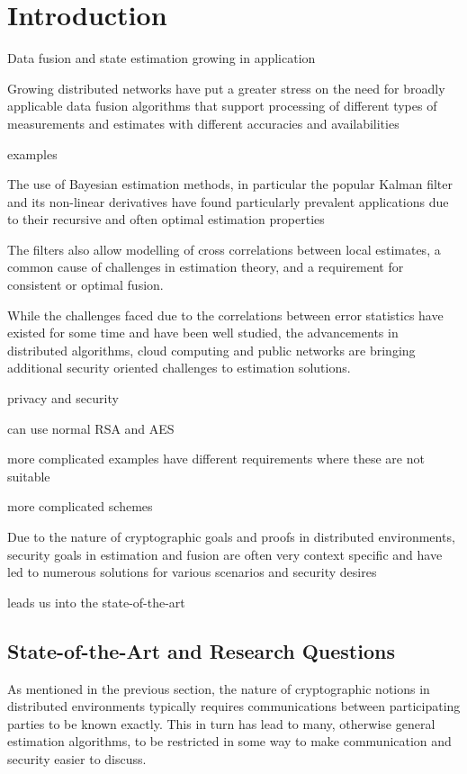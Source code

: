 
\chapter{Introduction}

Data fusion and state estimation growing in application

Growing distributed networks have put a greater stress on the need for broadly applicable data fusion algorithms that support processing of different types of measurements and estimates with different accuracies and availabilities

examples

The use of Bayesian estimation methods, in particular the popular Kalman filter and its non-linear derivatives have found particularly prevalent applications due to their recursive and often optimal estimation properties 

The filters also allow modelling of cross correlations between local estimates, a common cause of challenges in estimation theory, and a requirement for consistent or optimal fusion.

While the challenges faced due to the correlations between error statistics have existed for some time and have been well studied, the advancements in distributed algorithms, cloud computing and public networks are bringing additional security oriented challenges to estimation solutions.

privacy and security 

can use normal RSA and AES

more complicated examples have different requirements where these are not suitable

more complicated schemes

Due to the nature of cryptographic goals and proofs in distributed environments, security goals in estimation and fusion are often very context specific and have led to numerous solutions for various scenarios and security desires

leads us into the state-of-the-art


\section{State-of-the-Art and Research Questions}

As mentioned in the previous section, the nature of cryptographic notions in distributed environments typically requires communications between participating parties to be known exactly. This in turn has lead to many, otherwise general estimation algorithms, to be restricted in some way to make communication and security easier to discuss.

